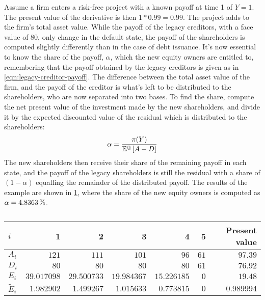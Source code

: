 \documentclass[main.tex]{subfiles}
\begin{document}
        Assume a firm enters a risk-free project with a known payoff at time 1 of $Y=\num{1}$. 
        The present value of the derivative is then $\num{1}*\num{0.99}=\num{0.99}$. 
        The project adds to the firm's total asset value. 
        While the payoff of the legacy creditors, with a face value of $\num{80}$, only change in the default state, the payoff of the shareholders is computed slightly differently than in the case of debt issuance. 
        It's now essential to know the share of the payoff, $\alpha$, which the new equity owners are entitled to, remembering that the payoff obtained by the legacy creditors is given as in \cref{eqn:legacy-creditor-payoff}. 
        The difference between the total asset value of the firm, and the payoff of the creditor is what's left to be distributed to the shareholders, who are now separated into two bases. 
        To find the share, compute the net present value of the investment made by the new shareholders, and divide it by the expected discounted value of the residual which is distributed to the shareholders:
        \begin{equation}
            \alpha = 
                \frac{
                    \pi(Y)
                }{
                    \mathbb{E}^{\mathbb{Q}}\left[A-D\right]
                }
        \end{equation}
        The new shareholders then receive their share of the remaining payoff in each state, and the payoff of the legacy shareholders is still the residual with a share of $(\num{1}-\alpha)$ equalling the remainder of the distributed payoff. 
        The results of the example are shown in \cref{tbl:equity-funding-payoff}, where the share of the new equity owners is computed as $\alpha = \pct{0.048363}$.

        \begin{table}[H]
            \centering\begin{tabular}{l|rrrrr||r}
                $i$ & 1 & 2 & 3 & 4 & 5 & Present value \\
                \hline
                $A_{i}$ & $\num{121}$ & $\num{111}$ & $\num{101}$ & $\num{96}$ & $\num{61}$ & $\num{97.39}$ \\
                $D_{i}$ & $\num{80}$ & $\num{80}$ & $\num{80}$ & $\num{80}$ & $\num{61}$ & $\num{76.92}$ \\
                $E_{i}$ & $\num{39.017098}$ & $\num{29.500733}$ & $\num{19.984367}$ & $\num{15.226185}$ & $\num{0}$ & $\num{19.48}$ \\
                $\tilde{E}_{i}$ & $\num{1.982902}$ & $\num{1.499267}$ & $\num{1.015633}$ & $\num{0.773815}$ & $\num{0}$ & $\num{0.989994}$ \\
            \end{tabular}
            \caption{}
            \label{tbl:equity-funding-payoff}
        \end{table}
\end{document}
